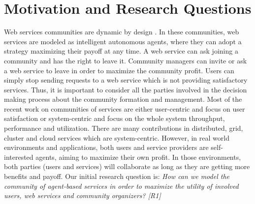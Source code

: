 \section{Motivation and Research Questions}\label{sec:researchquestions}

Web services communities are dynamic by design
\cite{DBLP:journals/ijebr/MaamarSTBB09}. In these communities, web
services are modeled as intelligent autonomous agents, where they
can adopt a strategy maximizing their payoff at any time. A web
service can ask joining a community and has the right to leave it.
Community managers can invite or ask a web service to leave in
order to maximize the community profit. Users can simply stop
sending requests to a web service which is not providing
satisfactory services. Thus, it is important to consider all the
parties involved in the decision making process about the
community formation and management. Most of the recent work on communities of
services are either user-centric and focus on user satisfaction
\cite{Chun02user-centricperformance} or system-centric and focus
on the whole system throughput, performance and utilization. There
are many contributions in distributed, grid, cluster and cloud
services which are system-centric. However, in real world
environments and applications, both users and service providers
are self-interested agents, aiming to maximize their own profit.
In those environments, both parties (users and services) will
collaborate as long as they are getting more benefits and payoff.
Our initial research question is: \emph{How can we model the
community of agent-based services in order to maximize the utility
of involved users, web services and community organizers? [R1]}


